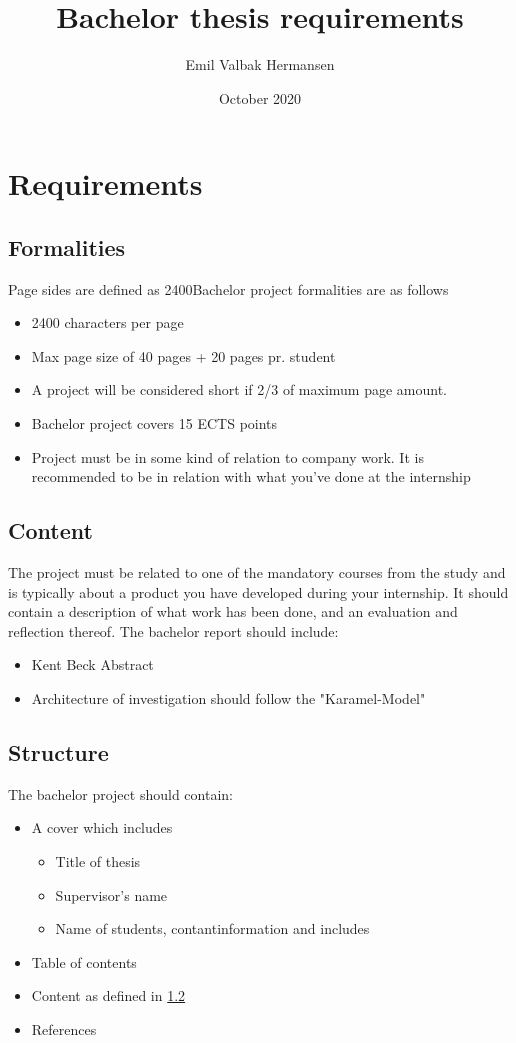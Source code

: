 \documentclass[a4paper]{report}
\title{Bachelor thesis requirements}
\author{Emil Valbak Hermansen}
\date{October 2020}
\begin{document}
\maketitle

\chapter{Requirements}
\section{Formalities}
Page sides are defined as 2400Bachelor project formalities are as follows\cite{CphbusinessBAP}
\begin{itemize}
    \item 2400 characters per page
    \item Max page size of 40 pages + 20 pages pr. student
    \item A project will be considered short if 2/3 of maximum page amount.
    \item Bachelor project covers 15 ECTS points 
    \item Project must be in some kind of relation to company work. It is recommended to be in relation with what you've done at the internship
\end{itemize}

\section{Content}
\label{sec:content}
The project must be related to one of the mandatory courses from the study and is typically about a product you have developed during your internship.
It should contain a description of what work has been done, and an evaluation and reflection thereof.
The bachelor report should include:\cite{CphbusinessBAP}
\begin{itemize}
    \item Kent Beck Abstract
    \item Architecture of investigation should follow the "Karamel-Model"
\end{itemize}



\section{Structure}
The bachelor project should contain:\cite{unimannheim2014guidelines}
\begin{itemize}
    \item A cover which includes
    \begin{itemize}
        \item Title of thesis
        \item Supervisor's name
        \item Name of students, contantinformation and includes
    \end{itemize}
    \item Table of contents
    \item Content as defined in \ref{sec:content}
    \item References
\end{itemize}

\printbibliography
\end{document}

